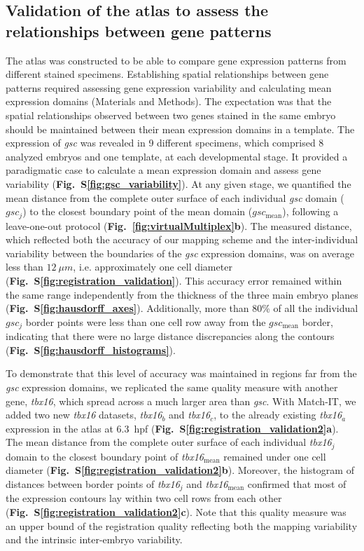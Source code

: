 \subsection*{Validation of the atlas to assess the relationships between gene patterns}

The atlas was constructed to be able to compare gene expression patterns from different stained specimens. Establishing spatial relationships between gene patterns required assessing gene expression variability and calculating mean expression domains (Materials and Methods). The expectation was that the spatial relationships observed between two genes stained in the same embryo should be maintained between their mean expression domains in a template. The expression of \emph{gsc} was revealed in 9 different specimens, which comprised 8 analyzed embryos and one template, at each developmental stage. It provided a paradigmatic case to calculate a mean expression domain and assess gene variability (\textbf{Fig.~S\ref{fig:gsc_variability}}). At any given stage, we quantified the mean distance from the complete outer surface of each individual \emph{gsc} domain ($gsc_j$) to the closest boundary point of the mean domain ($gsc_\mathrm{mean}$), following a leave-one-out protocol (\textbf{Fig.~\ref{fig:virtualMultiplex}b}). The measured distance, which reflected both the accuracy of our mapping scheme and the inter-individual variability between the boundaries of the \emph{gsc} expression domains, was on average less than $12~\mu m$, i.e. approximately one cell diameter (\textbf{Fig.~S\ref{fig:registration_validation}}). This accuracy error remained within the same range independently from the thickness of the three main embryo planes (\textbf{Fig.~S\ref{fig:hausdorff_axes}}). Additionally, more than 80\% of all the individual $gsc_j$ border points were less than one cell row away from the $gsc_\mathrm{mean}$ border, indicating that there were no large distance discrepancies along the contours (\textbf{Fig.~S\ref{fig:hausdorff_histograms}}).

To demonstrate that this level of accuracy was maintained in regions far from the \emph{gsc} expression domains, we replicated the same quality measure with another gene, \emph{tbx16}, which spread across a much larger area than \emph{gsc}. With Match-IT, we added two new \emph{tbx16} datasets, \emph{tbx16}$_b$ and \emph{tbx16}$_c$, to the already existing \emph{tbx16}$_a$ expression in the atlas at 6.3~hpf (\textbf{Fig.~S\ref{fig:registration_validation2}a}). The mean distance from the complete outer surface of each individual \emph{tbx16}$_j$ domain to the closest boundary point of \emph{tbx16}$_\mathrm{mean}$ remained under one cell diameter (\textbf{Fig.~S\ref{fig:registration_validation2}b}). Moreover, the histogram of distances between border points of \emph{tbx16}$_j$ and \emph{tbx16}$_\mathrm{mean}$ confirmed that most of the expression contours lay within two cell rows from each other (\textbf{Fig.~S\ref{fig:registration_validation2}c}). Note that this quality measure was an upper bound of the registration quality reflecting both the mapping variability and the intrinsic inter-embryo variability.

